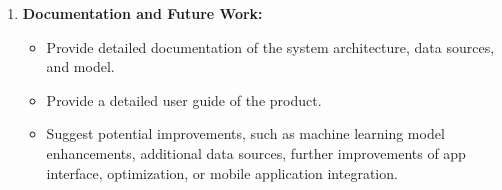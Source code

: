 \begin{enumerate}
    \item \textbf{Documentation and Future Work:}
    \begin{itemize}
        \item Provide detailed documentation of the system architecture, data sources, and model.
        \item Provide a detailed user guide of the product.
        \item Suggest potential improvements, such as machine learning model enhancements, additional data sources, further improvements of app interface, optimization, or mobile application integration. 
    \end{itemize}
\end{enumerate}

\newpage
